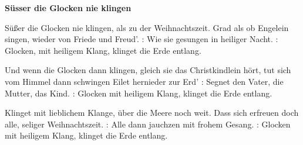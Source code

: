 \documentclass[10pt]{article}
\begin{document}
{\Large
\begin{guitar}
    \textbf{Süsser die Glocken nie klingen}


    Süßer die Glocken nie klingen,
    als zu der Weihnachtszeit.
    Grad als ob Engelein singen,
    wieder von Friede und Freud'.
    \textbar: Wie sie gesungen in heiliger Nacht. :\textbar
    Glocken, mit heiligem Klang,
    klinget die Erde entlang.


    Und wenn die Glocken dann klingen,
    gleich sie das Christkindlein hört,
    tut sich vom Himmel dann schwingen
    Eilet hernieder zur Erd'
    \textbar: Segnet den Vater, die Mutter, das Kind. :\textbar
    Glocken mit heiligem Klang,
    klinget die Erde entlang.


    Klinget mit lieblichem Klange,
    über die Meere noch weit.
    Dass sich erfreuen doch alle,
    seliger Weihnachtszeit.
    \textbar: Alle dann jauchzen mit frohem Gesang. :\textbar
    Glocken mit heiligem Klang,
    klinget die Erde entlang.
\end{guitar}
}
\end{document}
